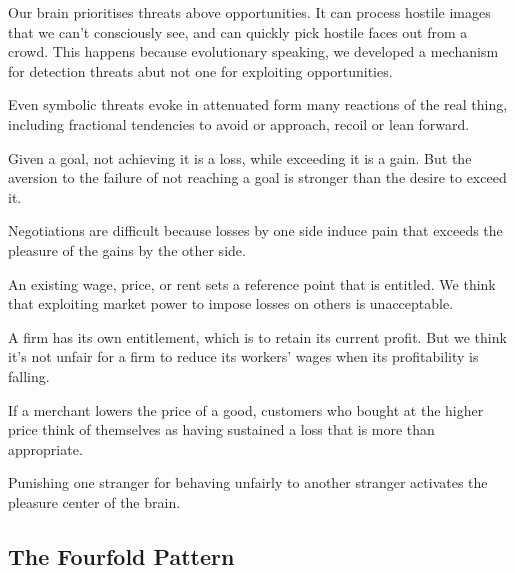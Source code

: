 \bit
\item Our brain prioritises threats above opportunities. It can process hostile images that we can't consciously see,
and can quickly pick hostile faces out from a crowd. This happens because evolutionary speaking, we developed a
mechanism for detection threats abut not one for exploiting opportunities.
\item Even symbolic threats evoke in attenuated form many reactions of the real thing, including fractional
tendencies to avoid or approach, recoil or lean forward.
\item Given a goal, not achieving it is a loss, while exceeding it is a gain. But the aversion to the failure of not
reaching a goal is stronger than the desire to exceed it.
\item Negotiations are difficult because losses by one side induce pain that exceeds the pleasure of the gains by the
other side.
\item An existing wage, price, or rent sets a reference point that is entitled. We think that exploiting market power
to impose losses on others is unacceptable.
\item A firm has its own entitlement, which is to retain its current profit. But we think it's not unfair for a firm
to reduce its workers' wages when its profitability is falling.
\item If a merchant lowers the price of a good, customers who bought at the higher price think of themselves as
having sustained a loss that is more than appropriate.
\item Punishing one stranger for behaving unfairly to another stranger activates the pleasure center of the brain.
\eit

\subsection*{The Fourfold Pattern}

